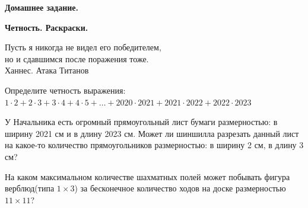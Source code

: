 \centerline{\bf \Huge Домашнее задание.}
\centerline{\bf \Huge Четность. Раскраски.}

\begin{flushright}
        \scriptsize{Пусть я никогда не видел его победителем,\\ но и сдавшимся после поражения тоже. \\Ханнес. Атака Титанов}
\end{flushright}

 Определите четность выражения:\\
$1\cdot2 + 2\cdot3 + 3\cdot4 + 4\cdot5 + … + 2020\cdot2021 + 2021\cdot2022 + 2022\cdot2023$

 У Начальника есть огромный прямоугольный лист бумаги размерностью: в ширину 2021 см и в длину 2023 см. Может ли шиншилла разрезать данный лист на какое-то количество прямоугольников размерностью: в ширину 2 см, в длину 3 см?
  
 На каком максимальном количестве шахматных полей может побывать фигура верблюд(типа $1\times3$) за бесконечное количество ходов на доске размерностью $11\times11$?